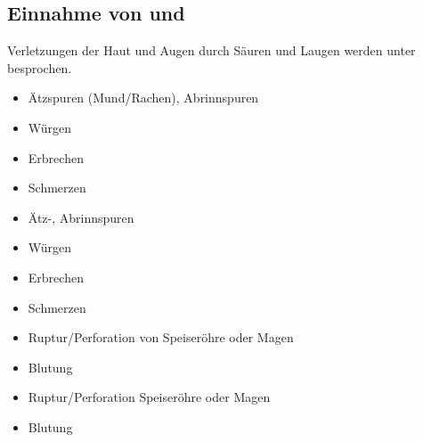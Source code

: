 \subsection{Einnahme von  und 
}
\label{topic:veraetzung-intoxikation}

Verletzungen der Haut und Augen durch Säuren und
Laugen werden unter 
besprochen.

\Text
{\TxBeschreibung}
{%
}
{}
{}
{}
{}
% 
% 

\TextSlide{\TxSymptome}
{
\begin{itemize}
    \item Ätzspuren (Mund/Rachen), Abrinnspuren
    \item Würgen
    \item Erbrechen
    \item Schmerzen
\end{itemize}
}{%
\begin{itemize}
  \item Ätz-, Abrinnspuren
  \item Würgen
  \item Erbrechen
  \item Schmerzen
\end{itemize}
}{}{}{}

\TextSlide{\TxGefahren}
{%
\begin{itemize}
  \item Ruptur/Perforation von Speiseröhre oder Magen
  \item Blutung
\end{itemize}
}{
\begin{itemize}
  \item Ruptur/Perforation Speiseröhre oder Magen
  \item Blutung
\end{itemize}
}{}{}{}





